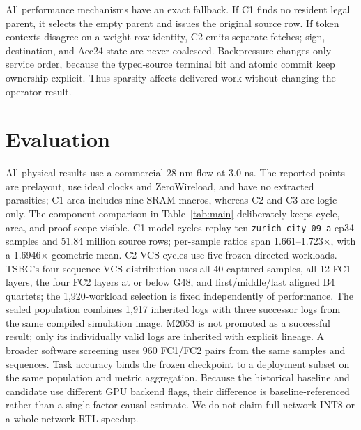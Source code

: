 \documentclass[conference]{IEEEtran}
\begin{document}
All performance mechanisms have an exact fallback.  If C1 finds no resident
legal parent, it selects the empty parent and issues the original source row.
If token contexts disagree on a weight-row identity, C2 emits separate fetches;
sign, destination, and Acc24 state are never coalesced.  Backpressure changes
only service order, because the typed-source terminal bit and atomic commit keep
ownership explicit.  Thus sparsity affects delivered work without changing the
operator result.

\section{Evaluation}
All physical results use a commercial 28-nm flow at 3.0 ns.  The reported
points are prelayout, use ideal clocks and ZeroWireload, and have no extracted
parasitics; C1 area includes nine SRAM macros, whereas C2 and C3 are logic-only.
The component
comparison in Table~\ref{tab:main} deliberately keeps cycle, area, and proof
scope visible.  C1 model cycles replay ten \texttt{zurich\_city\_09\_a} ep34 samples and 51.84 million source
rows; per-sample ratios span 1.661--1.723$\times$, with a 1.6946$\times$
geometric mean.  C2 VCS cycles use five frozen directed workloads.  TSBG's
four-sequence VCS distribution uses all 40 captured samples, all 12 FC1 layers,
the four FC2 layers at or below G48, and first/middle/last aligned B4 quartets;
the 1,920-workload selection is fixed independently of performance.
The sealed population combines 1,917 inherited logs with three successor logs
from the same compiled simulation image.  M2053 is not promoted as a successful
result; only its individually valid logs are inherited with explicit lineage.
A broader software screening uses 960 FC1/FC2 pairs from the same samples and
sequences.  Task accuracy binds the frozen checkpoint to a deployment subset
on the same population and metric aggregation.  Because the historical baseline
and candidate use different GPU backend flags, their difference is
baseline-referenced rather than a single-factor causal estimate.  We do not
claim full-network INT8 or a whole-network RTL speedup.
\end{document}
